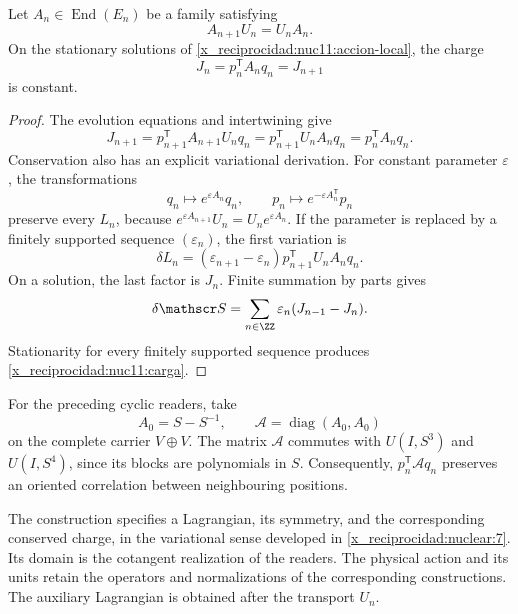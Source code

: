 \begin{proposition}
\label{x_reciprocidad:nuc11:noether}
Let \(A_n\in\operatorname{End}(E_n)\) be a family satisfying
\[
 A_{n+1}U_n=U_nA_n.
\]
On the stationary solutions of \eqref{x_reciprocidad:nuc11:accion-local}, the charge
\begin{equation}
 \boxed{J_n=p_n^{\mathsf T}A_nq_n=J_{n+1}}
 \label{x_reciprocidad:nuc11:carga}
\end{equation}
is constant.
\end{proposition}
\begin{proof}
The evolution equations and intertwining give
\[
 J_{n+1}
 =p_{n+1}^{\mathsf T}A_{n+1}U_nq_n
 =p_{n+1}^{\mathsf T}U_nA_nq_n
 =p_n^{\mathsf T}A_nq_n.
\]
Conservation also has an explicit variational derivation. For constant parameter \(\varepsilon\), the transformations
\[
 q_n\mapsto e^{\varepsilon A_n}q_n,\qquad
 p_n\mapsto e^{-\varepsilon A_n^{\mathsf T}}p_n
\]
preserve every \(L_n\), because \(e^{\varepsilon A_{n+1}}U_n=U_ne^{\varepsilon A_n}\). If the parameter is replaced by a finitely supported sequence \((\varepsilon_n)\), the first variation is
\[
 \delta L_n
 =(\varepsilon_{n+1}-\varepsilon_n)
   p_{n+1}^{\mathsf T}U_nA_nq_n.
\]
On a solution, the last factor is \(J_n\). Finite summation by parts gives
\[
 \delta\mathscr S
 =\sum_{n\in\ZZ}\varepsilon_n(J_{n-1}-J_n).
\]
Stationarity for every finitely supported sequence produces \eqref{x_reciprocidad:nuc11:carga}.
\end{proof}

For the preceding cyclic readers, take
\[
 A_0=S-S^{-1},\qquad
 \mathcal A=\operatorname{diag}(A_0,A_0)
\]
on the complete carrier \(V\oplus V\). The matrix \(\mathcal A\) commutes with \(U(I,S^3)\) and \(U(I,S^4)\), since its blocks are polynomials in \(S\). Consequently, \(p_n^{\mathsf T}\mathcal A q_n\) preserves an oriented correlation between neighbouring positions.

The construction specifies a Lagrangian, its symmetry, and the corresponding conserved charge, in the variational sense developed in \cref{x_reciprocidad:nuclear:7}. Its domain is the cotangent realization of the readers. The physical action and its units retain the operators and normalizations of the corresponding constructions. The auxiliary Lagrangian is obtained after the transport \(U_n\).

